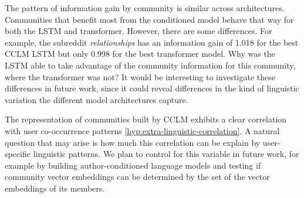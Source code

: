 \documentclass[11pt,a4paper]{article}
\begin{document}
The pattern of information gain by community is similar across
architectures.  Communities that benefit most from the conditioned
model behave that way for both the LSTM and transformer.  However,
there are some differences.  For example, the subreddit
\emph{relationships} has an information gain of \num{1.018} for the
best CCLM LSTM but only \num{0.998} for the best transformer model.
Why was the LSTM able to take advantage of the community information
for this community, where the transformer was not?  It would be
interesting to investigate these differences in future work, since it
could reveal differences in the kind of linguistic variation the
different model architectures capture.

The representation of communities built by CCLM exhibits a clear
correlation with user co-occurrence patterns
\ref{hyp:extra-linguistic-correlation}. A natural
question that may arise is how much this correlation can be explain by
user-specific linguistic patterns. We plan to control for this variable
in future work, for example by building author-conditioned language
models and testing if community vector embeddings can be determined by
the set of the vector embeddings of its members.



\end{document}

